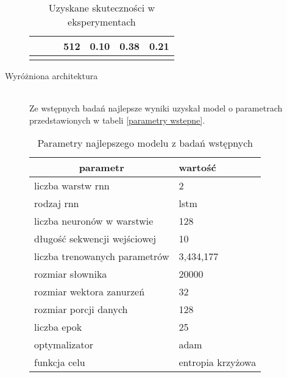 \begin{description}
\begin{table}[ht]
{\begin{tabular}{cccclll}
        \multicolumn{1}{|c|}{}                    & \multicolumn{1}{c|}{}                     & \multicolumn{1}{c|}{}                   & \multicolumn{1}{c|}{512}                        & \multicolumn{1}{l|}{0.10}     & \multicolumn{1}{l|}{0.38}     & \multicolumn{1}{l|}{0.21}                    \\ \hline
                                                  &                                           &                                         &                                                 &                            &                            &                                          
        \end{tabular}}
    \caption{Uzyskane skuteczności w eksperymentach} 
    \label{wyniki}
\end{table} 

\item[Wyróżniona architektura]
\hfill\\
\label{wyrozniony}
Ze wstępnych badań najlepsze wyniki uzyskał model o parametrach przedstawionych w tabeli \ref{parametry wstepne}. 
\begin{table}[ht]
    \centering
    \begin{tabular}{|l|l|}
        \hline
        \multicolumn{1}{|c|}{parametr} & wartość   \\ \hline
        liczba warstw rnn              & 2                 \\ \hline
        rodzaj rnn                     & lstm              \\ \hline
        liczba neuronów w warstwie     & 128               \\ \hline
        długość sekwencji wejściowej   & 10                \\ \hline
        liczba trenowanych parametrów  & 3,434,177         \\ \hline
        rozmiar słownika               & 20000             \\ \hline
        rozmiar wektora zanurzeń       & 32                \\ \hline
        rozmiar porcji danych          & 128               \\ \hline
        liczba epok                    & 25                \\ \hline
        optymalizator                  & adam              \\ \hline
        funkcja celu                   & entropia krzyżowa \\ \hline
        \end{tabular}
    \caption{Parametry najlepszego modelu z badań wstępnych} 


\end{table}
\end{description}
